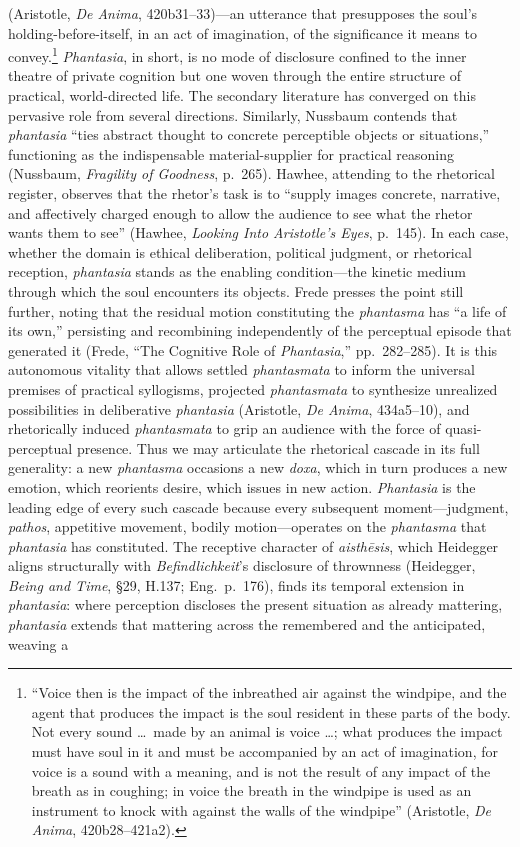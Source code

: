 \documentclass{article}
\begin{document}
(Aristotle, \textit{De Anima}, 420b31--33)---an utterance that presupposes the soul's holding-before-itself, in an act of imagination, of the significance it means to convey.\footnote{``Voice then is the impact of the inbreathed air against the windpipe, and the agent that produces the impact is the soul resident in these parts of the body. Not every sound \ldots\ made by an animal is voice \ldots; what produces the impact must have soul in it and must be accompanied by an act of imagination, for voice is a sound with a meaning, and is not the result of any impact of the breath as in coughing; in voice the breath in the windpipe is used as an instrument to knock with against the walls of the windpipe'' (Aristotle, \textit{De Anima}, 420b28--421a2).} \textit{Phantasia}, in short, is no mode of disclosure confined to the inner theatre of private cognition but one woven through the entire structure of practical, world-directed life. The secondary literature has converged on this pervasive role from several directions. Similarly, Nussbaum contends that \textit{phantasia} ``ties abstract thought to concrete perceptible objects or situations,'' functioning as the indispensable material-supplier for practical reasoning (Nussbaum, \textit{Fragility of Goodness}, p.~265). Hawhee, attending to the rhetorical register, observes that the rhetor's task is to ``supply images concrete, narrative, and affectively charged enough to allow the audience to see what the rhetor wants them to see'' (Hawhee, \textit{Looking Into Aristotle's Eyes}, p.~145). In each case, whether the domain is ethical deliberation, political judgment, or rhetorical reception, \textit{phantasia} stands as the enabling condition---the kinetic medium through which the soul encounters its objects. Frede presses the point still further, noting that the residual motion constituting the \textit{phantasma} has ``a life of its own,'' persisting and recombining independently of the perceptual episode that generated it (Frede, ``The Cognitive Role of \textit{Phantasia},'' pp.~282--285). It is this autonomous vitality that allows settled \textit{phantasmata} to inform the universal premises of practical syllogisms, projected \textit{phantasmata} to synthesize unrealized possibilities in deliberative \textit{phantasia} (Aristotle, \textit{De Anima}, 434a5--10), and rhetorically induced \textit{phantasmata} to grip an audience with the force of quasi-perceptual presence. Thus we may articulate the rhetorical cascade in its full generality: a new \textit{phantasma} occasions a new \textit{doxa}, which in turn produces a new emotion, which reorients desire, which issues in new action. \textit{Phantasia} is the leading edge of every such cascade because every subsequent moment---judgment, \textit{pathos}, appetitive movement, bodily motion---operates on the \textit{phantasma} that \textit{phantasia} has constituted. The receptive character of \textit{aisth\={e}sis}, which Heidegger aligns structurally with \textit{Befindlichkeit}'s disclosure of thrownness (Heidegger, \textit{Being and Time}, \S29, H.137; Eng.~p.~176), finds its temporal extension in \textit{phantasia}: where perception discloses the present situation as already mattering, \textit{phantasia} extends that mattering across the remembered and the anticipated, weaving a 
\end{document}
